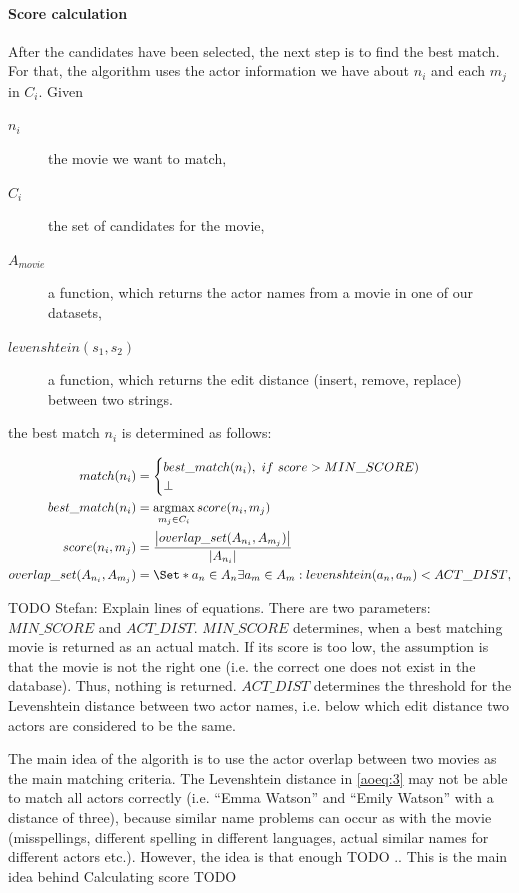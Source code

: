\paragraph{Score calculation}
After the candidates have been selected, the next step is to find the best match.
For that, the algorithm uses the actor information we have about $n_i$ and each $m_j$ in $C_i$.
Given
\begin{description}
	\item[$n_i$] the movie we want to match,
	\item[$C_i$] the set of candidates for the movie,
	\item[$A_{movie}$] a function, which returns the actor names from a movie in one of our datasets,
	\item[$levenshtein(s_1, s_2)$] a function, which returns the edit distance (insert, remove, replace) between two strings.
\end{description}
the best match $n_i$ is determined as follows:

\begin{align}
	match(n_i) &=
		\begin{cases}
			best\_match(n_i),~if~score > MIN\_SCORE) \\
			\bot
		\end{cases} \\
	best\_match(n_i) &=
		\argmax_{m_j \in C_i} score(n_i, m_j)\label{aoeq:1}\\
	score(n_i, m_j) &=
		\frac
			{\left\lvert overlap\_set(A_{n_i}, A_{m_j}) \right\rvert}
			{\left\lvert A_{n_i} \right\rvert}\label{aoeq:2}\\
	overlap\_set(A_{n_i}, A_{m_j}) &=
		\Set*{a_n \in A_n}{\exists a_m \in A_m: levenshtein(a_n, a_m) < ACT\_DIST},\label{aoeq:3}
\end{align}

TODO Stefan: Explain lines of equations.
There are two parameters: $MIN\_SCORE$ and $ACT\_DIST$.
$MIN\_SCORE$ determines, when a best matching movie is returned as an actual match.
If its score is too low, the assumption is that the movie is not the right one (i.e. the correct one does not exist in the database).
Thus, nothing is returned.
$ACT\_DIST$ determines the threshold for the Levenshtein distance between two actor names, i.e. below which edit distance two actors are considered to be the same.

The main idea of the algorith is to use the actor overlap between two movies as the main matching criteria.
The Levenshtein distance in \ref{aoeq:3} may not be able to match all actors correctly (i.e. "`Emma Watson"' and "`Emily Watson"' with a distance of three), because similar name problems can occur as with the movie (misspellings, different spelling in different languages, actual similar names for different actors etc.).
However, the idea is that enough TODO ..
This is the main idea behind 
Calculating score TODO

